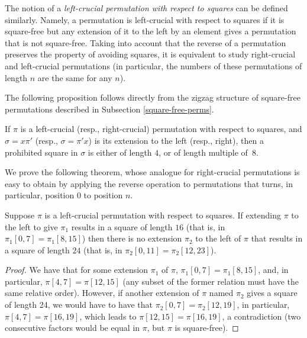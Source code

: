 \documentclass[12pt,reqno]{article}
\begin{document}
The notion of a {\em left-crucial permutation with respect to squares} can be defined similarly. Namely, a permutation is left-crucial with respect to squares if it is square-free but any extension of it to the left by an element gives a permutation that is not square-free. Taking into account that the reverse of a permutation  preserves the property of avoiding squares, it is equivalent to study right-crucial and left-crucial permutations (in particular, the numbers of these permutations of length $n$ are the same for any $n$).



The following proposition follows directly from the zigzag structure of square-free permutations described in Subsection \ref{square-free-perms}.

\begin{proposition}\label{prohibited-squares}\sloppypar If $\pi$ is a left-crucial (resp., right-crucial) permutation with respect to squares, and $\sigma=x\pi'$ (resp.,  $\sigma=\pi'x$) is its extension to the left (resp., right), then a prohibited square in $\sigma$ is either of length $4$, or of length multiple of~$8$. \end{proposition}

We prove the following theorem, whose analogue for right-crucial permutations is easy to obtain by applying the reverse operation to permutations that  turns, in particular, position 0 to position $n$.

\begin{theorem}\label{thm-16-24} Suppose $\pi$ is a left-crucial permutation with respect to squares. If extending $\pi$  to the left to give $\pi_1$ results in a square of length $16$ (that is, in $\pi_1[0, 7]=\pi_1[8,15]$) then there is no extension $\pi_2$ to the left of $\pi$ that results in a square of length $24$ (that is, in $\pi_2[0, 11]=\pi_2[12, 23]$).\end{theorem}

\begin{proof} We have that for some extension $\pi_1$ of $\pi$, $\pi_1[0, 7]=\pi_1[8, 15]$, and, in particular, $\pi[4, 7] = \pi[12, 15]$ (any subset of the former relation must have the same relative order). However, if another extension of $\pi$ named $\pi_2$ gives a square of length 24, we would have to have that $\pi_2[0,7]=\pi_2[12, 19]$, in particular, $\pi[4, 7]=\pi[16, 19]$, which leads to $\pi[12, 15]=\pi[16, 19]$, a contradiction (two consecutive factors would be equal in $\pi$, but $\pi$ is square-free). \end{proof}
\end{document}
